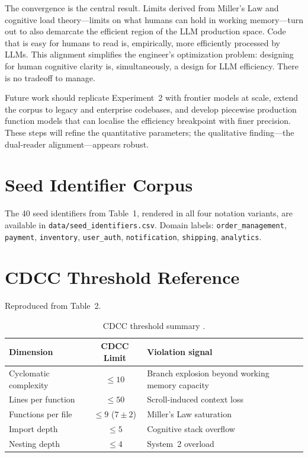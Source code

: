 \documentclass[11pt,a4paper]{article}
\begin{document}
The convergence is the central result. Limits derived from Miller's Law and
cognitive load theory---limits on what humans can hold in working
memory---turn out to also demarcate the efficient region of the LLM production
space. Code that is easy for humans to read is, empirically, more efficiently
processed by LLMs. This alignment simplifies the engineer's optimization
problem: designing for human cognitive clarity is, simultaneously, a design
for LLM efficiency. There is no tradeoff to manage.

Future work should replicate Experiment~2 with frontier models at scale,
extend the corpus to legacy and enterprise codebases, and develop piecewise
production function models that can localise the efficiency breakpoint with
finer precision. These steps will refine the quantitative parameters; the
qualitative finding---the dual-reader alignment---appears robust.




\appendix
\renewcommand{\thesection}{Appendix~\Alph{section}}

\section{Seed Identifier Corpus}

The 40 seed identifiers from \citet{pereira2026a} Table~1, rendered in all
four notation variants, are available in \texttt{data/seed\_identifiers.csv}.
Domain labels: \texttt{order\_management}, \texttt{payment},
\texttt{inventory}, \texttt{user\_auth}, \texttt{notification},
\texttt{shipping}, \texttt{analytics}.

\section{CDCC Threshold Reference}

Reproduced from \citet{pereira2026b} Table~2.

\begin{table}[h]
\centering
\small
\begin{tabularx}{\textwidth}{lcX}
\toprule
Dimension & CDCC Limit & Violation signal \\
\midrule
Cyclomatic complexity & $\leq 10$          & Branch explosion beyond working memory capacity \\
Lines per function    & $\leq 50$          & Scroll-induced context loss \\
Functions per file    & $\leq 9$ ($7\pm2$) & Miller's Law saturation \\
Import depth          & $\leq 5$           & Cognitive stack overflow \\
Nesting depth         & $\leq 4$           & System~2 overload \citep{kahneman2011} \\
\bottomrule
\end{tabularx}
\caption{CDCC threshold summary \citep{pereira2026b}.}
\end{table}
\end{document}
